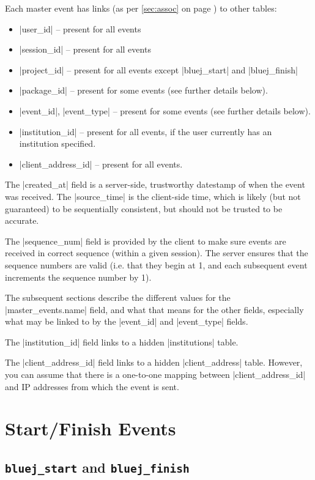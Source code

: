 \documentclass{book}
\newcommand{\myref}[1]{\autoref{#1} on page \pageref*{#1}}
\begin{document}
Each master event has links (as per \myref{sec:assoc}) to other tables:
\begin{itemize}
\item |user_id| -- present for all events
\item |session_id| -- present for all events
\item |project_id| -- present for all events except |bluej_start| and |bluej_finish|
\item |package_id| -- present for some events (see further details below).
\item |event_id|, |event_type| -- present for some events (see further details below).
\item |institution_id| -- present for all events, if the user currently has an
  institution specified.
\item |client_address_id| -- present for all events.
\end{itemize}

The |created_at| field is a server-side, trustworthy datestamp of when
the event was received.  The |source_time| is the client-side time,
which is likely (but not guaranteed) to be sequentially consistent, but should
not be trusted to be accurate.

The |sequence_num| field is provided by the client to make sure events are
received in correct sequence (within a given session).  The server ensures
that the sequence numbers are valid (i.e. that they begin at 1, and each
subsequent event increments the sequence number by 1).

The subsequent sections describe the different values for the
|master_events.name| field, and what that means for the other fields,
especially what may be linked to by the |event_id| and |event_type| fields.


The |institution_id| field links to a hidden |institutions| table.


The |client_address_id| field links to a hidden |client_address| table.
However, you can assume that there is a one-to-one mapping between
|client_address_id| and IP addresses from which the event is sent.


\section{Start/Finish Events}

\subsection{\lstinline|bluej_start| and \lstinline|bluej_finish|}
\end{document}
